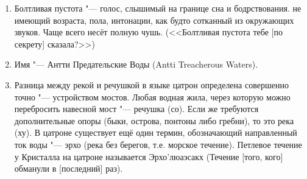 \documentclass[a4paper,10pt]{book}
\begin{document}
\begin{enumerate}
\item Болтливая пустота "--- голос, слышимый на границе сна и бодрствования. не 
имеющий возраста, пола, интонации, как будто сотканный из окружающих звуков. 
Чаще всего несёт полную чушь. (<<Болтливая пустота тебе [по секрету] сказала?>>)

\item Имя "--- Антти Предательские Воды (Antti Treacherous Waters).
\item Разница между рекой и речушкой в языке цатрон определена совершенно точно 
"---
устройством мостов. Любая водная жила, через которую можно перебросить навесной
мост "--- речушка (со). Если же требуются дополнительные опоры (быки, острова, 
понтоны либо
гребни), то это река (ху). В цатроне существует ещё один термин, обозначающий 
направленный ток воды
"--- эрхо (река без берегов, т.е. морское течение). Петлевое течение у 
Кристалла на цатроне называется
Эрхо'люаэсакх (Течение [того, кого] обманули в [последний] раз).


\end{enumerate}
\end{document}
